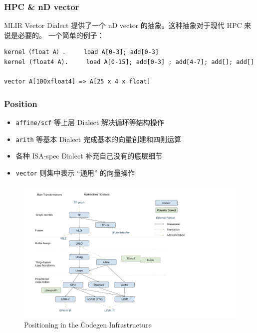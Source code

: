 \documentclass[aspectratio=169]{ctexbeamer}
\begin{document}
\begin{frame}[fragile]
    \frametitle{HPC \& nD vector}
    MLIR Vector Dialect 提供了一个 nD vector 的抽象。这种抽象对于现代 HPC 来说是必要的。
    一个简单的例子：

    \begin{lstlisting}
kernel（float A）.     load A[0-3]; add[0-3]
kernel (float4 A).     load A[0-15]; add[0-3] ; add[4-7]; add[]; add[]

vector A[100xfloat4] => A[25 x 4 x float]
    \end{lstlisting}
\end{frame}



\begin{frame}
    \frametitle{Position}
    \begin{minipage}[t]{0.47\textwidth}
        \small
        \begin{itemize}
            \item \texttt{affine/scf} 等上层 Dialect 解决循环等结构操作
            \item \texttt{arith} 等基本 Dialect 完成基本的向量创建和四则运算
            \item 各种 ISA-spec Dialect 补充自己没有的底层细节
            \item \texttt{vector} 则集中表示 ``通用'' 的向量操作
        \end{itemize}
    \end{minipage}%
    \begin{minipage}[t]{0.5\textwidth}
        \begin{figure}
            \centering
            \includegraphics[width=1.0\linewidth]{images/position.png}
            \caption{Positioning in the Codegen Infrastructure}
        \end{figure}
    \end{minipage}
\end{frame}
\end{document}
